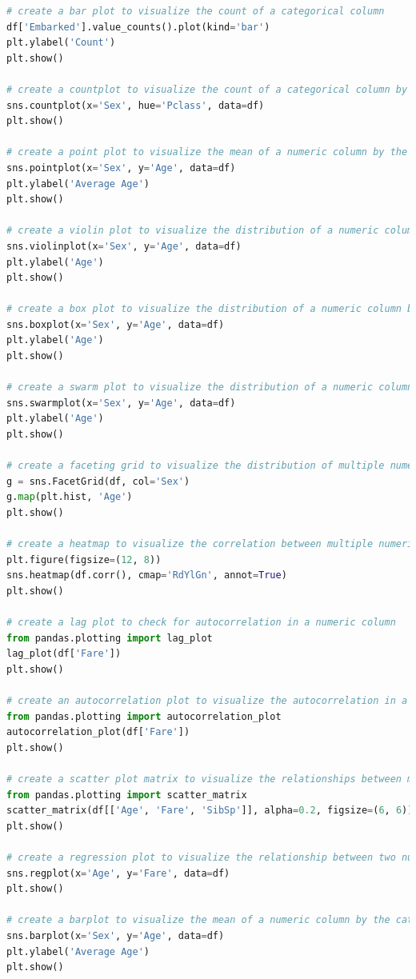 \documentclass[11pt]{article}
\begin{document}
\begin{mdframed}[backgroundcolor=celadon!6]
\begin{lstlisting}[language=Python]
# create a bar plot to visualize the count of a categorical column
df['Embarked'].value_counts().plot(kind='bar')
plt.ylabel('Count')
plt.show()

# create a countplot to visualize the count of a categorical column by the categories of another categorical column
sns.countplot(x='Sex', hue='Pclass', data=df)
plt.show()

# create a point plot to visualize the mean of a numeric column by the categories of a categorical column
sns.pointplot(x='Sex', y='Age', data=df)
plt.ylabel('Average Age')
plt.show()

# create a violin plot to visualize the distribution of a numeric column by the categories of a categorical column
sns.violinplot(x='Sex', y='Age', data=df)
plt.ylabel('Age')
plt.show()

# create a box plot to visualize the distribution of a numeric column by the categories of a categorical column
sns.boxplot(x='Sex', y='Age', data=df)
plt.ylabel('Age')
plt.show()

# create a swarm plot to visualize the distribution of a numeric column by the categories of a categorical column
sns.swarmplot(x='Sex', y='Age', data=df)
plt.ylabel('Age')
plt.show()

# create a faceting grid to visualize the distribution of multiple numeric columns by the categories of a categorical column
g = sns.FacetGrid(df, col='Sex')
g.map(plt.hist, 'Age')
plt.show()

# create a heatmap to visualize the correlation between multiple numeric columns
plt.figure(figsize=(12, 8))
sns.heatmap(df.corr(), cmap='RdYlGn', annot=True)
plt.show()

# create a lag plot to check for autocorrelation in a numeric column
from pandas.plotting import lag_plot
lag_plot(df['Fare'])
plt.show()

# create an autocorrelation plot to visualize the autocorrelation in a numeric column
from pandas.plotting import autocorrelation_plot
autocorrelation_plot(df['Fare'])
plt.show()

# create a scatter plot matrix to visualize the relationships between multiple numeric columns
from pandas.plotting import scatter_matrix
scatter_matrix(df[['Age', 'Fare', 'SibSp']], alpha=0.2, figsize=(6, 6))
plt.show()

# create a regression plot to visualize the relationship between two numeric columns
sns.regplot(x='Age', y='Fare', data=df)
plt.show()

# create a barplot to visualize the mean of a numeric column by the categories of a categorical column
sns.barplot(x='Sex', y='Age', data=df)
plt.ylabel('Average Age')
plt.show()


\end{lstlisting}
\end{mdframed}
\end{document}
